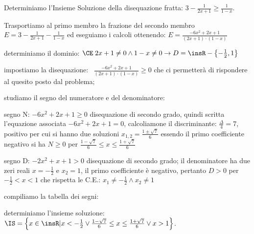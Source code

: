 \begin{esempio}
Determiniamo l'Insieme Soluzione della disequazione fratta: $3-\frac 1{2x+1}\ge 
\frac 1{1-x}$.
\begin{enumeratea}
\item Trasportiamo al primo membro la frazione del secondo membro $E=3-\frac 
1{2x+1}-\frac 1{1-x}$ ed eseguiamo i calcoli ottenendo: 
$E=\frac{-6x^2+2x+1}{(2x+1)\cdot (1-x)}$
\item determiniamo il dominio: $\CE \;2x+1\neq 0\wedge 1-x\neq 0\to 
D=\insR-\left\{-\frac 1 2,1\right\}$
\item impostiamo la disequazione: \ $\frac{-6x^2+2x+1}{(2x+1)\cdot (1-x)}\ge 0$ 
che ci permetterà di rispondere al quesito posto dal problema;
\item studiamo il segno del numeratore e del denominatore:
\begin{itemize*}
\item segno N: $-6x^2+2x+1\ge 0$ disequazione di secondo grado, quindi scritta 
l'equazione associata $-6x^2+2x+1=0$, calcoliamone il discriminante: 
$\frac{\Delta } 4=7$, positivo per cui si hanno due soluzioni 
$x_{1,2}=\frac{1\pm \sqrt 7} 6$ essendo il primo coefficiente negativo si ha 
$N\ge 0$ per $\frac{1-\sqrt 7} 6\le x\le \frac{1+\sqrt 7} 6$
\item segno D: $-2x^2+x+1>0$ disequazione di secondo grado; il denominatore ha 
due zeri reali $x=-\frac 1 2$ e $x_2=1$, il primo coefficiente è negativo, 
pertanto $D>0$ per $-\frac 1 2<x<1$ che rispetta le C.E.: $x_1\neq -\frac 1 
2\wedge x_2\neq 1$
\end{itemize*}
\item compiliamo la tabella dei segni:
\begin{center}
 
\end{center}
\item determiniamo l'insieme soluzione: $\IS=\left\{x\in \insR | x<-\frac 1 
2\vee \frac{1-\sqrt 7} 6\le x\le \frac{1+\sqrt 7} 6\vee x>1\right\}$.
\end{enumeratea}
\end{esempio}

% 

